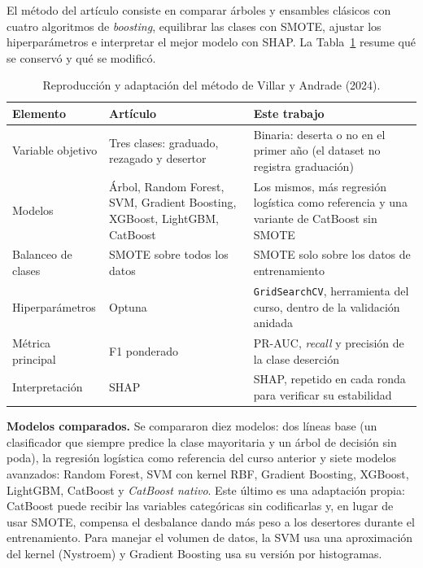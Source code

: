 \documentclass[11pt,a4paper]{article}
\begin{document}
El método del artículo consiste en comparar árboles y ensambles clásicos con cuatro algoritmos de \textit{boosting}, equilibrar las clases con SMOTE, ajustar los hiperparámetros e interpretar el mejor modelo con SHAP. La Tabla~\ref{tab:adaptacion} resume qué se conservó y qué se modificó.

\begin{table}[H]
\centering
\footnotesize
\caption{Reproducción y adaptación del método de Villar y Andrade (2024).}
\label{tab:adaptacion}
\begin{tabular}{>{\raggedright\arraybackslash}p{2.5cm}>{\raggedright\arraybackslash}p{4.6cm}>{\raggedright\arraybackslash}p{7.1cm}}
\toprule
Elemento & Artículo & Este trabajo \\
\midrule
Variable objetivo & Tres clases: graduado, rezagado y desertor & Binaria: deserta o no en el primer año (el dataset no registra graduación) \\
Modelos & Árbol, Random Forest, SVM, Gradient Boosting, XGBoost, LightGBM, CatBoost & Los mismos, más regresión logística como referencia y una variante de CatBoost sin SMOTE \\
Balanceo de clases & SMOTE sobre todos los datos & SMOTE solo sobre los datos de entrenamiento \\
Hiperparámetros & Optuna & \texttt{GridSearchCV}, herramienta del curso, dentro de la validación anidada \\
Métrica principal & F1 ponderado & PR-AUC, \textit{recall} y precisión de la clase deserción \\
Interpretación & SHAP & SHAP, repetido en cada ronda para verificar su estabilidad \\
\bottomrule
\end{tabular}
\end{table}

\textbf{Modelos comparados.} Se compararon diez modelos: dos líneas base (un clasificador que siempre predice la clase mayoritaria y un árbol de decisión sin poda), la regresión logística como referencia del curso anterior y siete modelos avanzados: Random Forest, SVM con kernel RBF, Gradient Boosting, XGBoost, LightGBM, CatBoost y \emph{CatBoost nativo}. Este último es una adaptación propia: CatBoost puede recibir las variables categóricas sin codificarlas y, en lugar de usar SMOTE, compensa el desbalance dando más peso a los desertores durante el entrenamiento. Para manejar el volumen de datos, la SVM usa una aproximación del kernel (Nystroem) y Gradient Boosting usa su versión por histogramas.
\end{document}
